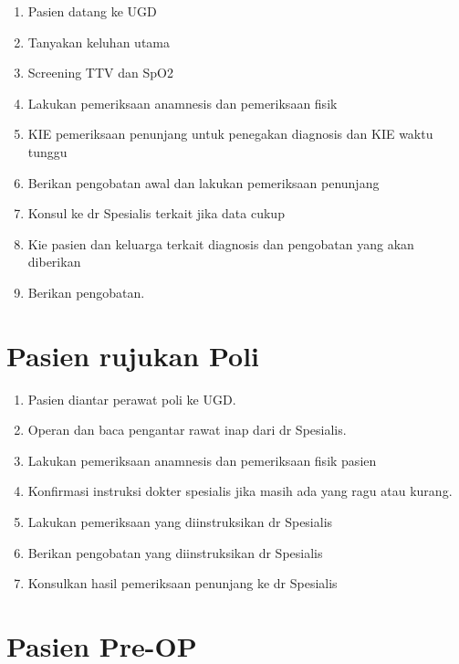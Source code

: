 \documentclass[
]{book}
\providecommand{\tightlist}{%
  \setlength{\itemsep}{0pt}\setlength{\parskip}{0pt}}
\begin{document}
\begin{enumerate}
\def\labelenumi{\arabic{enumi}.}
\tightlist
\item
  Pasien datang ke UGD
\item
  Tanyakan keluhan utama
\item
  Screening TTV dan SpO2
\item
  Lakukan pemeriksaan anamnesis dan pemeriksaan fisik
\item
  KIE pemeriksaan penunjang untuk penegakan diagnosis dan KIE waktu tunggu
\item
  Berikan pengobatan awal dan lakukan pemeriksaan penunjang
\item
  Konsul ke dr Spesialis terkait jika data cukup
\item
  Kie pasien dan keluarga terkait diagnosis dan pengobatan yang akan diberikan
\item
  Berikan pengobatan.
\end{enumerate}

\hypertarget{pasien-rujukan-poli}{%
\section{Pasien rujukan Poli}\label{pasien-rujukan-poli}}

\begin{enumerate}
\def\labelenumi{\arabic{enumi}.}
\tightlist
\item
  Pasien diantar perawat poli ke UGD.
\item
  Operan dan baca pengantar rawat inap dari dr Spesialis.
\item
  Lakukan pemeriksaan anamnesis dan pemeriksaan fisik pasien
\item
  Konfirmasi instruksi dokter spesialis jika masih ada yang ragu atau kurang.
\item
  Lakukan pemeriksaan yang diinstruksikan dr Spesialis
\item
  Berikan pengobatan yang diinstruksikan dr Spesialis
\item
  Konsulkan hasil pemeriksaan penunjang ke dr Spesialis
\end{enumerate}

\hypertarget{pasien-pre-op}{%
\section{Pasien Pre-OP}\label{pasien-pre-op}}
\end{document}
